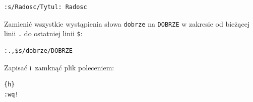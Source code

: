 \begin{example}
\begin{lstlisting}[style=MyBashStyle]
:s/Radosc/Tytul: Radosc
\end{lstlisting}

\begin{myitemize}
\item Zamienić wszystkie wystąpienia słowa \lstinline[style=MyBashStyle]{dobrze} na \lstinline[style=MyBashStyle]{DOBRZE} w zakresie od bieżącej linii \lstinline[style=MyBashStyle]{.} do ostatniej linii \lstinline[style=MyBashStyle]{$}:
\end{myitemize}

\begin{lstlisting}[style=MyBashStyle]
:.,$s/dobrze/DOBRZE
\end{lstlisting}

Zapisać i~zamknąć plik poleceniem: 

\begin{lstlisting}[style=MyBashStyle]{h}
:wq!
\end{lstlisting}
\end{example} 

\clearpage  
{}
{\label{viRef}

}



